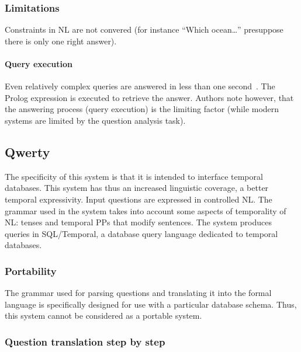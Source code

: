 \documentclass[10pt,journal,letterpaper,compsoc]{IEEEtran}
\begin{document}
\subsubsection{Limitations}
Constraints in NL are not convered (for instance ``Which ocean\ldots''
presuppose there is only one right answer).


\paragraph{Query execution}
Even relatively complex queries are answered in less than
one second~\cite{Warren:1982:EEA:972942.972944}.
The Prolog expression is executed to retrieve the
answer.
Authors note however, that the answering process (query execution) is the
limiting factor (while modern systems are limited by the question analysis task). 













\subsection{{\sc Qwerty}~\cite{Nelken:2000:QTD:992730.992808}}
The specificity of this system is that it is intended to interface temporal
databases. This system has thus an increased linguistic coverage, a better
temporal expressivity. 
Input questions are expressed in controlled NL.
The grammar used in the system takes into account some aspects of
temporality of NL: tenses and temporal PPs that modify sentences.
The system produces queries in SQL/Temporal, a database query language
dedicated to temporal databases.

\subsubsection{Portability}
The grammar used for parsing questions and translating it
into the formal language is specifically designed for use with a particular
database schema. Thus, this system cannot be considered as a portable system.

\subsubsection{Question translation step by step}
\end{document}
